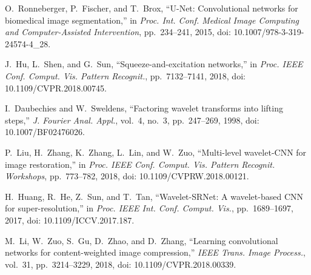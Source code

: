 \documentclass[conference]{IEEEtran}
\begin{document}
\begin{thebibliography}{00}
O.~Ronneberger, P.~Fischer, and T.~Brox, ``U-Net: Convolutional networks for biomedical image segmentation,'' in \textit{Proc. Int. Conf. Medical Image Computing and Computer-Assisted Intervention}, pp.~234--241, 2015, doi: 10.1007/978-3-319-24574-4\_28.

J.~Hu, L.~Shen, and G.~Sun, ``Squeeze-and-excitation networks,'' in \textit{Proc. IEEE Conf. Comput. Vis. Pattern Recognit.}, pp.~7132--7141, 2018, doi: 10.1109/CVPR.2018.00745.

I.~Daubechies and W.~Sweldens, ``Factoring wavelet transforms into lifting steps,'' \textit{J. Fourier Anal. Appl.}, vol.~4, no.~3, pp.~247--269, 1998, doi: 10.1007/BF02476026.

P.~Liu, H.~Zhang, K.~Zhang, L.~Lin, and W.~Zuo, ``Multi-level wavelet-CNN for image restoration,'' in \textit{Proc. IEEE Conf. Comput. Vis. Pattern Recognit. Workshops}, pp.~773--782, 2018, doi: 10.1109/CVPRW.2018.00121.

H.~Huang, R.~He, Z.~Sun, and T.~Tan, ``Wavelet-SRNet: A wavelet-based CNN for super-resolution,'' in \textit{Proc. IEEE Int. Conf. Comput. Vis.}, pp.~1689--1697, 2017, doi: 10.1109/ICCV.2017.187.

M.~Li, W.~Zuo, S.~Gu, D.~Zhao, and D.~Zhang, ``Learning convolutional networks for content-weighted image compression,'' \textit{IEEE Trans. Image Process.}, vol.~31, pp.~3214--3229, 2018, doi: 10.1109/CVPR.2018.00339.

\end{thebibliography}
\end{document}
